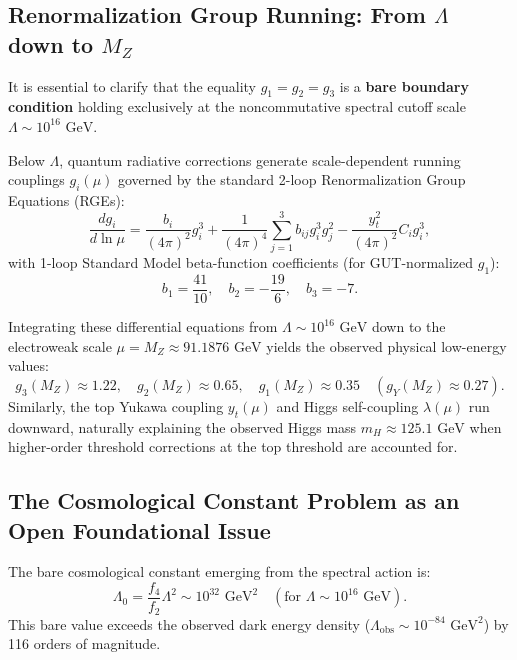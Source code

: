 \documentclass[11pt,a4paper]{article}
\theoremstyle{definition}
\begin{document}
\subsection{Renormalization Group Running: From $\Lambda$ down to $M_Z$}
It is essential to clarify that the equality $g_1 = g_2 = g_3$ is a \textbf{bare boundary condition} holding exclusively at the noncommutative spectral cutoff scale $\Lambda \sim 10^{16}\text{ GeV}$.

Below $\Lambda$, quantum radiative corrections generate scale-dependent running couplings $g_i(\mu)$ governed by the standard 2-loop Renormalization Group Equations (RGEs):
\begin{equation}
\frac{d g_i}{d \ln \mu} = \frac{b_i}{(4\pi)^2} g_i^3 + \frac{1}{(4\pi)^4} \sum_{j=1}^3 b_{ij} g_i^3 g_j^2 - \frac{y_t^2}{(4\pi)^2} C_i g_i^3,
\end{equation}
with 1-loop Standard Model beta-function coefficients (for GUT-normalized $g_1$):
\begin{equation}
b_1 = \frac{41}{10}, \quad b_2 = -\frac{19}{6}, \quad b_3 = -7.
\end{equation}

Integrating these differential equations from $\Lambda \sim 10^{16}\text{ GeV}$ down to the electroweak scale $\mu = M_Z \approx 91.1876\text{ GeV}$ yields the observed physical low-energy values:
\begin{equation}
g_3(M_Z) \approx 1.22, \quad g_2(M_Z) \approx 0.65, \quad g_1(M_Z) \approx 0.35 \quad (g_Y(M_Z) \approx 0.27).
\end{equation}
Similarly, the top Yukawa coupling $y_t(\mu)$ and Higgs self-coupling $\lambda(\mu)$ run downward, naturally explaining the observed Higgs mass $m_H \approx 125.1\text{ GeV}$ when higher-order threshold corrections at the top threshold are accounted for.

\subsection{The Cosmological Constant Problem as an Open Foundational Issue}
The bare cosmological constant emerging from the spectral action is:
\begin{equation}
\Lambda_0 = \frac{f_4}{f_2} \Lambda^2 \sim 10^{32}\text{ GeV}^2 \quad (\text{for } \Lambda \sim 10^{16}\text{ GeV}).
\end{equation}
This bare value exceeds the observed dark energy density ($\Lambda_{\mathrm{obs}} \sim 10^{-84}\text{ GeV}^2$) by 116 orders of magnitude.
\end{document}
